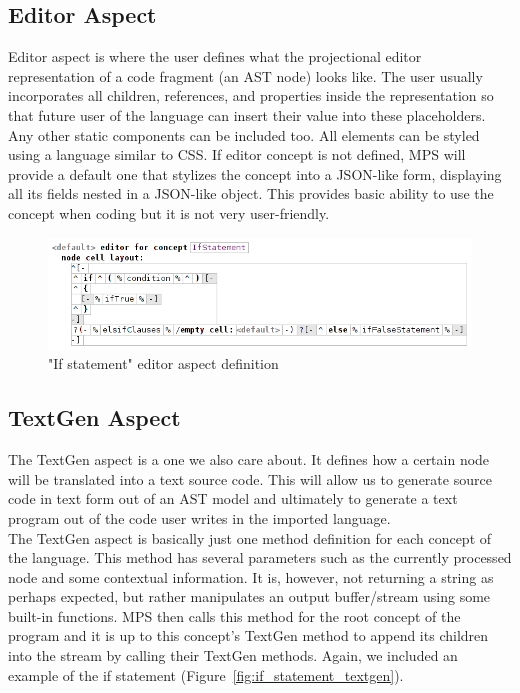 \subsection{Editor Aspect}
\label{chap:about_editor_aspect}

Editor aspect is where the user defines what the projectional editor representation of a code fragment (an AST node) looks like.
The user usually incorporates all children, references, and properties inside the representation so that future user of the language can insert their value into these placeholders.
Any other static components can be included too.
All elements can be styled using a language similar to CSS.
If editor concept is not defined, MPS will provide a default one that stylizes the concept into a JSON-like form, displaying all its fields nested in a JSON-like object.
This provides basic ability to use the concept when coding but it is not very user-friendly.

\begin{figure}[h]
	\centering
	\includegraphics[width=\textwidth]{./img/if_statement_editor_definition.png}
	\caption{"If statement" editor aspect definition}
	\label{fig:if_editor_definition}
\end{figure}

\subsection{TextGen Aspect}
The TextGen aspect is a one we also care about.
It defines how a certain node will be translated into a text source code.
This will allow us to generate source code in text form out of an AST model and ultimately to generate a text program out of the code user writes in the imported language.
\\

The TextGen aspect is basically just one method definition for each concept of the language.
This method has several parameters such as the currently processed node and some contextual information.
It is, however, not returning a string as perhaps expected, but rather manipulates an output buffer/stream using some built-in functions.
MPS then calls this method for the root concept of the program and it is up to this concept's TextGen method to append its children into the stream by calling their TextGen methods.
Again, we included an example of the if statement (Figure~\ref{fig:if_statement_textgen}).

